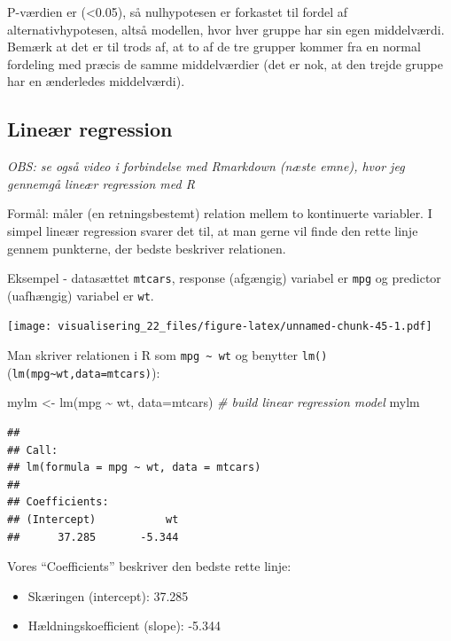 \documentclass[
]{book}
\newenvironment{Shaded}{\begin{snugshade}}{\end{snugshade}}
\newcommand{\AttributeTok}[1]{\textcolor[rgb]{0.77,0.63,0.00}{#1}}
\newcommand{\CommentTok}[1]{\textcolor[rgb]{0.56,0.35,0.01}{\textit{#1}}}
\newcommand{\FunctionTok}[1]{\textcolor[rgb]{0.00,0.00,0.00}{#1}}
\newcommand{\NormalTok}[1]{#1}
\newcommand{\OtherTok}[1]{\textcolor[rgb]{0.56,0.35,0.01}{#1}}
\newcommand{\SpecialCharTok}[1]{\textcolor[rgb]{0.00,0.00,0.00}{#1}}
\providecommand{\tightlist}{%
  \setlength{\itemsep}{0pt}\setlength{\parskip}{0pt}}
\begin{document}
P-værdien er (\textless0.05), så nulhypotesen er forkastet til fordel af alternativhypotesen, altså modellen, hvor hver gruppe har sin egen middelværdi. Bemærk at det er til trods af, at to af de tre grupper kommer fra en normal fordeling med præcis de samme middelværdier (det er nok, at den trejde gruppe har en ænderledes middelværdi).

\hypertarget{lineuxe6r-regression}{%
\subsection{Lineær regression}\label{lineuxe6r-regression}}

\emph{OBS: se også video i forbindelse med Rmarkdown (næste emne), hvor jeg gennemgå lineær regression med R}

Formål: måler (en retningsbestemt) relation mellem to kontinuerte variabler. I simpel lineær regression svarer det til, at man gerne vil finde den rette linje gennem punkterne, der bedste beskriver relationen.

Eksempel - datasættet \texttt{mtcars}, response (afgængig) variabel er \texttt{mpg} og predictor (uafhængig) variabel er \texttt{wt}.

\texttt{[image: visualisering\_22\_files/figure-latex/unnamed-chunk-45-1.pdf]}

Man skriver relationen i R som \texttt{mpg\ \textasciitilde{}\ wt} og benytter \texttt{lm()}(\texttt{lm(mpg\textasciitilde{}wt,data=mtcars)}):

\begin{Shaded}
\begin{Highlighting}[]
\NormalTok{mylm }\OtherTok{\textless{}{-}} \FunctionTok{lm}\NormalTok{(mpg }\SpecialCharTok{\textasciitilde{}}\NormalTok{ wt, }\AttributeTok{data=}\NormalTok{mtcars)  }\CommentTok{\# build linear regression model}
\NormalTok{mylm}
\end{Highlighting}
\end{Shaded}

\begin{verbatim}
## 
## Call:
## lm(formula = mpg ~ wt, data = mtcars)
## 
## Coefficients:
## (Intercept)           wt  
##      37.285       -5.344
\end{verbatim}

Vores ``Coefficients'' beskriver den bedste rette linje:

\begin{itemize}
\tightlist
\item
  Skæringen (intercept): 37.285
\item
  Hældningskoefficient (slope): -5.344
\end{itemize}
\end{document}
